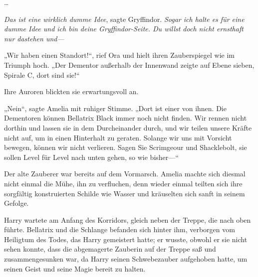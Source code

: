 …

\emph{Das ist eine wirklich dumme Idee}, sagte Gryffindor. \emph{Sogar ich halte es für eine dumme Idee und ich bin deine Gryffindor-Seite. Du willst doch nicht ernsthaft nur dastehen und—}

\later

„Wir haben einen Standort!“, rief Ora und hielt ihren Zauberspiegel wie im Triumph hoch. „Der Dementor außerhalb der Innenwand zeigte auf Ebene sieben, Spirale C, dort sind sie!“

Ihre Auroren blickten sie erwartungsvoll an.

„Nein“, sagte Amelia mit ruhiger Stimme. „Dort ist einer von ihnen. Die Dementoren können Bellatrix Black immer noch nicht finden. Wir rennen nicht dorthin und lassen sie in dem Durcheinander durch, und wir teilen unsere Kräfte nicht auf, um in einen Hinterhalt zu geraten. Solange wir uns mit Vorsicht bewegen, können wir nicht verlieren. Sagen Sie Scrimgeour und Shacklebolt, sie sollen Level für Level nach unten gehen, so wie bisher—“

Der alte Zauberer war bereits auf dem Vormarsch. Amelia machte sich diesmal nicht einmal die Mühe, ihn zu verfluchen, denn wieder einmal teilten sich ihre sorgfältig konstruierten Schilde wie Wasser und kräuselten sich sanft in seinem Gefolge.

\later

Harry wartete am Anfang des Korridors, gleich neben der Treppe, die nach oben führte. Bellatrix und die Schlange befanden sich hinter ihm, verborgen vom Heiligtum des Todes, das Harry gemeistert hatte; er wusste, obwohl er sie nicht sehen konnte, dass die abgemagerte Zauberin auf der Treppe saß und zusammengesunken war, da Harry seinen Schwebezauber aufgehoben hatte, um seinen Geist und seine Magie bereit zu halten.

